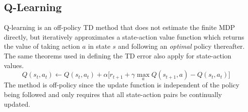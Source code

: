 \subsection{Q-Learning}
\label{sec:qlearning}
%
Q-learning is an off-policy TD method that does not estimate the finite
MDP directly, but iteratively approximates a state-action value
function which returns the value of taking action $a$ in state $s$ and
following an \textit{optimal} policy thereafter. The same theorems used in defining the TD error also apply for
state-action values.
\begin{equation}
\label{eq:qlearning}
Q(s_t,a_t) \leftarrow Q(s_t,a_t) + \alpha \bigl[r_{t+1} + \gamma\max_a
Q(s_{t+1},a)-Q(s_t,a_t) \bigr]
\end{equation}
The method is off-policy since the update function is independent of the policy
being followed and only requires that all state-action pairs be continually
updated.

